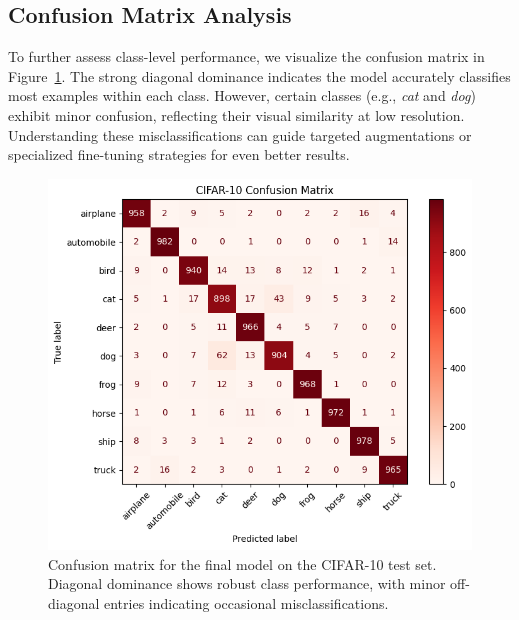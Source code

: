 \documentclass[letterpaper]{article}
\begin{document}
\subsection{Confusion Matrix Analysis}
To further assess class-level performance, we visualize the confusion matrix in Figure~\ref{fig:conf_matrix}. The strong diagonal dominance indicates the model accurately classifies most examples within each class. However, certain classes (e.g., \emph{cat} and \emph{dog}) exhibit minor confusion, reflecting their visual similarity at low resolution. Understanding these misclassifications can guide targeted augmentations or specialized fine-tuning strategies for even better results.
\begin{figure}[ht]
    \centering
    \includegraphics[width=0.8\linewidth]{conf_matrix.png}
    \caption{Confusion matrix for the final model on the CIFAR-10 test set. Diagonal dominance shows robust class performance, with minor off-diagonal entries indicating occasional misclassifications.}
    \label{fig:conf_matrix}
\end{figure}
\end{document}
